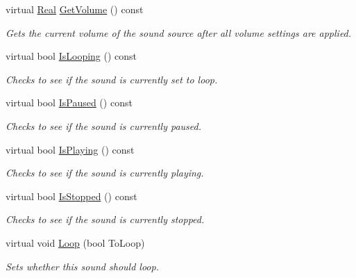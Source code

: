\begin{DoxyCompactItemize}
virtual \hyperlink{namespaceMezzanine_a726731b1a7df72bf3583e4a97282c6f6}{Real} \hyperlink{classMezzanine_1_1Audio_1_1Sound_ac6fe43760b1957e2193a6ff7516d47af}{GetVolume} () const 
\begin{DoxyCompactList}\small\item\em Gets the current volume of the sound source after all volume settings are applied. \item\end{DoxyCompactList}\item 
virtual bool \hyperlink{classMezzanine_1_1Audio_1_1Sound_aae77074cbaae126241c6547afdeb131c}{IsLooping} () const 
\begin{DoxyCompactList}\small\item\em Checks to see if the sound is currently set to loop. \item\end{DoxyCompactList}\item 
virtual bool \hyperlink{classMezzanine_1_1Audio_1_1Sound_ac51d8a20e3ce5453416ef21162be2a87}{IsPaused} () const 
\begin{DoxyCompactList}\small\item\em Checks to see if the sound is currently paused. \item\end{DoxyCompactList}\item 
virtual bool \hyperlink{classMezzanine_1_1Audio_1_1Sound_a625331bf3d995a129529a780a97f086b}{IsPlaying} () const 
\begin{DoxyCompactList}\small\item\em Checks to see if the sound is currently playing. \item\end{DoxyCompactList}\item 
virtual bool \hyperlink{classMezzanine_1_1Audio_1_1Sound_a9174378c97699bb32812984cd74b51ee}{IsStopped} () const 
\begin{DoxyCompactList}\small\item\em Checks to see if the sound is currently stopped. \item\end{DoxyCompactList}\item 
virtual void \hyperlink{classMezzanine_1_1Audio_1_1Sound_ae8747ddd906e7e0f65ba4ac1aa748525}{Loop} (bool ToLoop)
\begin{DoxyCompactList}\small\item\em Sets whether this sound should loop. \item\end{DoxyCompactList}\item 

\end{DoxyCompactItemize}
